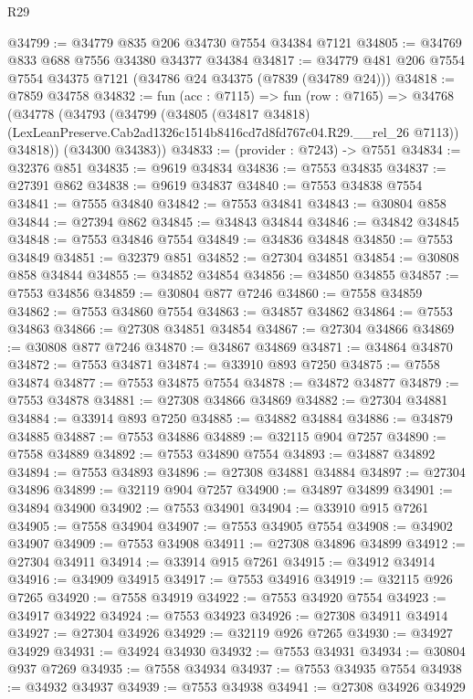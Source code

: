 \begin{lexlean}{R29}
\begin{coremodule}
@34799 := @34779 @835 @206 @34730 @7554 @34384 @7121
@34805 := @34769 @833 @688 @7556 @34380 @34377 @34384
@34817 := @34779 @481 @206 @7554 @7554 @34375 @7121 (@34786 @24 @34375 (@7839 (@34789 @24)))
@34818 := @7859 @34758
@34832 := fun (acc : @7115) =>
  fun (row : @7165) =>
  @34768
    (@34778
      (@34793
        (@34799
          (@34805
            (@34817 @34818)
            (LexLeanPreserve.Cab2ad1326c1514b8416cd7d8fd767c04.R29.__rel_26 @7113))
          @34818))
      (@34300 @34383))
@34833 := (provider : @7243) -> @7551
@34834 := @32376 @851
@34835 := @9619 @34834
@34836 := @7553 @34835
@34837 := @27391 @862
@34838 := @9619 @34837
@34840 := @7553 @34838 @7554
@34841 := @7555 @34840
@34842 := @7553 @34841
@34843 := @30804 @858
@34844 := @27394 @862
@34845 := @34843 @34844
@34846 := @34842 @34845
@34848 := @7553 @34846 @7554
@34849 := @34836 @34848
@34850 := @7553 @34849
@34851 := @32379 @851
@34852 := @27304 @34851
@34854 := @30808 @858 @34844
@34855 := @34852 @34854
@34856 := @34850 @34855
@34857 := @7553 @34856
@34859 := @30804 @877 @7246
@34860 := @7558 @34859
@34862 := @7553 @34860 @7554
@34863 := @34857 @34862
@34864 := @7553 @34863
@34866 := @27308 @34851 @34854
@34867 := @27304 @34866
@34869 := @30808 @877 @7246
@34870 := @34867 @34869
@34871 := @34864 @34870
@34872 := @7553 @34871
@34874 := @33910 @893 @7250
@34875 := @7558 @34874
@34877 := @7553 @34875 @7554
@34878 := @34872 @34877
@34879 := @7553 @34878
@34881 := @27308 @34866 @34869
@34882 := @27304 @34881
@34884 := @33914 @893 @7250
@34885 := @34882 @34884
@34886 := @34879 @34885
@34887 := @7553 @34886
@34889 := @32115 @904 @7257
@34890 := @7558 @34889
@34892 := @7553 @34890 @7554
@34893 := @34887 @34892
@34894 := @7553 @34893
@34896 := @27308 @34881 @34884
@34897 := @27304 @34896
@34899 := @32119 @904 @7257
@34900 := @34897 @34899
@34901 := @34894 @34900
@34902 := @7553 @34901
@34904 := @33910 @915 @7261
@34905 := @7558 @34904
@34907 := @7553 @34905 @7554
@34908 := @34902 @34907
@34909 := @7553 @34908
@34911 := @27308 @34896 @34899
@34912 := @27304 @34911
@34914 := @33914 @915 @7261
@34915 := @34912 @34914
@34916 := @34909 @34915
@34917 := @7553 @34916
@34919 := @32115 @926 @7265
@34920 := @7558 @34919
@34922 := @7553 @34920 @7554
@34923 := @34917 @34922
@34924 := @7553 @34923
@34926 := @27308 @34911 @34914
@34927 := @27304 @34926
@34929 := @32119 @926 @7265
@34930 := @34927 @34929
@34931 := @34924 @34930
@34932 := @7553 @34931
@34934 := @30804 @937 @7269
@34935 := @7558 @34934
@34937 := @7553 @34935 @7554
@34938 := @34932 @34937
@34939 := @7553 @34938
@34941 := @27308 @34926 @34929

\end{coremodule}
\end{lexlean}
